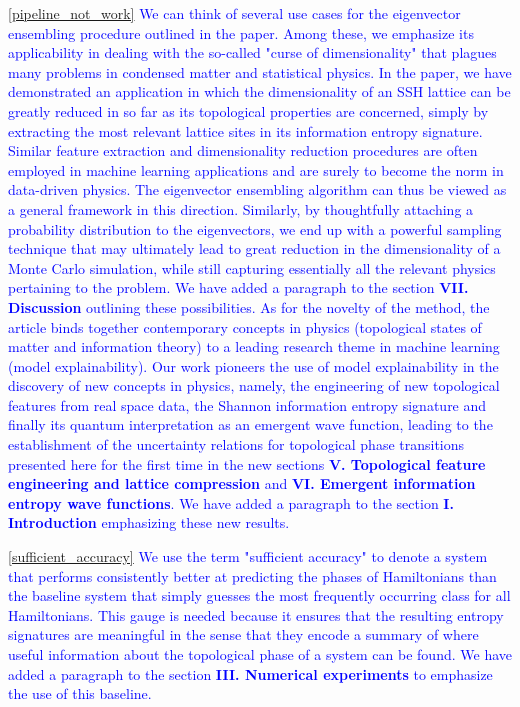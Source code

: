 \documentclass[10pt]{revtex4-1}
\newcommand{\citequote}[1]{\ref{#1}}
\begin{document}
\vspace{0.25cm}
\textcolor{blue}{\citequote{pipeline_not_work} We can think of several use cases for the eigenvector ensembling procedure outlined in the paper. Among these, we emphasize its applicability in dealing with the so-called "curse of dimensionality" that plagues many problems in condensed matter and statistical physics. In the paper, we have demonstrated an application in which the dimensionality of an SSH lattice can be greatly reduced in so far as its topological properties are concerned, simply by extracting the most relevant lattice sites in its information entropy signature. Similar feature extraction and dimensionality reduction procedures are often employed in machine learning applications and are surely to become the norm in data-driven physics. The eigenvector ensembling algorithm can thus be viewed as a general framework in this direction. Similarly, by thoughtfully attaching a probability distribution to the eigenvectors, we end up with a powerful sampling technique that may ultimately lead to great reduction in the dimensionality of a Monte Carlo simulation, while still capturing essentially all the relevant physics pertaining to the problem. We have added a paragraph to the section \textbf{VII. Discussion} outlining these possibilities. As for the novelty of the method, the article binds together contemporary concepts in physics (topological states of matter and information theory) to a leading research theme in machine learning (model explainability). Our work pioneers the use of model explainability in the discovery of new concepts in physics, namely, the engineering of new topological features from real space data, the Shannon information entropy signature and finally its quantum interpretation as an emergent wave function, leading to the establishment of the uncertainty relations for topological phase transitions presented here for the first time in the new sections \textbf{V. Topological feature engineering and lattice compression} and \textbf{VI. Emergent information entropy wave functions}. We have added a paragraph to the section \textbf{I. Introduction} emphasizing these new results.  
}  

\textcolor{blue}{\citequote{sufficient_accuracy} We use the term "sufficient accuracy" to denote a system that performs consistently better at predicting the phases of Hamiltonians than the baseline system that simply guesses the most frequently occurring class for all Hamiltonians. This gauge is needed because it ensures that the resulting entropy signatures are meaningful in the sense that they encode a summary of where useful information about the topological phase of a system can be found. We have added a paragraph to the section \textbf{III. Numerical experiments} to emphasize the use of this baseline.}  
\end{document}
